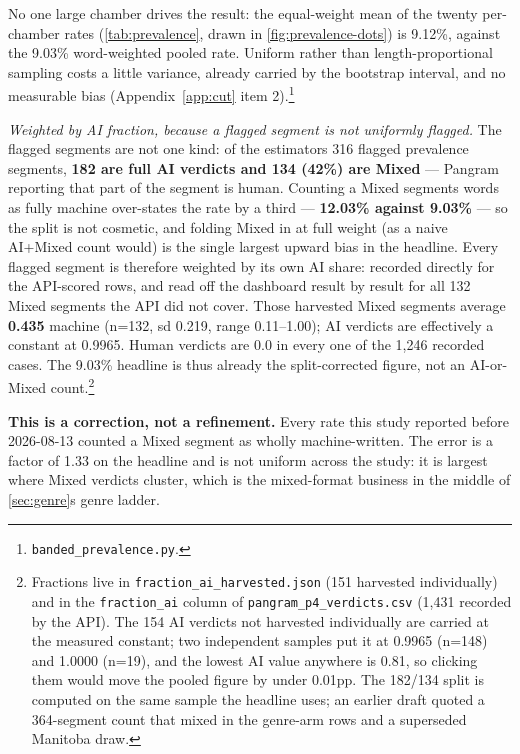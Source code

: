 No one large chamber drives the result: the equal-weight mean of the twenty per-chamber rates (\cref{tab:prevalence}, drawn in \cref{fig:prevalence-dots}) is 9.12\%, against the 9.03\% word-weighted pooled rate. Uniform
rather than length-proportional sampling costs a little variance, already
carried by the bootstrap interval, and no measurable bias
(Appendix~\ref{app:cut} item 2).\footnote{\texttt{banded\_prevalence.py}.}

\emph{Weighted by AI fraction, because a flagged segment is not uniformly flagged.}
The flagged segments are not one kind: of the estimator\textquotesingle s 316 flagged
prevalence segments, \textbf{182 are full AI verdicts and 134 (42\%) are Mixed} ---
Pangram reporting that part of the segment is human. Counting a Mixed
segment\textquotesingle s words as fully machine over-states the rate by a third --- \textbf{12.03\%
against 9.03\%} --- so the split is not cosmetic, and folding Mixed in at full
weight (as a naive AI+Mixed count would) is the single largest upward bias
in the headline. Every flagged segment is therefore weighted by its own AI
share: recorded directly for the API-scored rows, and read off the dashboard
result by result for all 132 Mixed segments the API did not cover. Those
harvested Mixed segments average \textbf{0.435} machine (n=132, sd 0.219, range
0.11--1.00); AI verdicts are effectively a constant at 0.9965. Human verdicts
are 0.0 in every one of the 1,246 recorded cases. The 9.03\% headline is thus
already the split-corrected figure, not an AI-or-Mixed count.\footnote{Fractions live in \texttt{fraction\_\allowbreak{}ai\_\allowbreak{}harvested.\allowbreak{}json} (151 harvested
  individually) and in the \texttt{fraction\_ai} column of
  \texttt{pangram\_\allowbreak{}p4\_\allowbreak{}verdicts.\allowbreak{}csv} (1,431 recorded by the API). The 154 AI verdicts
  not harvested individually are carried at the measured constant; two
  independent samples put it at 0.9965 (n=148) and 1.0000 (n=19), and the
  lowest AI value anywhere is 0.81, so clicking them would move the pooled
  figure by under 0.01pp. The 182/134 split is computed on the same sample
  the headline uses; an earlier draft quoted a 364-segment count that mixed
  in the genre-arm rows and a superseded Manitoba draw.}

\textbf{This is a correction, not a refinement.} Every rate this study reported
before 2026-08-13 counted a Mixed segment as wholly machine-written. The error
is a factor of 1.33 on the headline and is not uniform across the study: it is
largest where Mixed verdicts cluster, which is the mixed-format business in the
middle of \cref{sec:genre}\textquotesingle s genre ladder.

